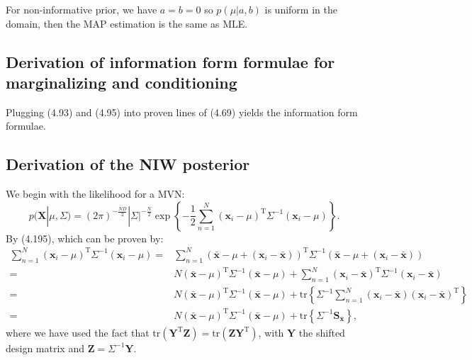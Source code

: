 \documentclass[UTF8]{ctexart}
\begin{document}
For non-informative prior, we have $a=b=0$ so $p(\mu|a,b)$ is uniform in the domain, then the MAP estimation is the same as MLE.

\subsection{Derivation of information form formulae for marginalizing and conditioning}
Plugging (4.93) and (4.95) into proven lines of (4.69) yields the information form formulae.

\subsection{Derivation of the NIW posterior}
We begin with the likelihood for a MVN:
$$p(\textbf{X}|\mu,\Sigma) = (2\pi)^{-\frac{ND}{2}}|\Sigma|^{-\frac{N}{2}}\exp\left\{ -\frac{1}{2}\sum_{n=1}^{N}(\textbf{x}_{i}-\mu)^{\text{T}}\Sigma^{-1}(\textbf{x}_{i}-\mu) \right\}.$$
By (4.195), which can be proven by:
\begin{align}
\sum_{n=1}^{N}(\textbf{x}_{i}-\mu)^{\text{T}}\Sigma^{-1}(\textbf{x}_{i}-\mu) =&\sum_{n=1}^{N}(\bar{\textbf{x}} - \mu + (\textbf{x}_{i} - \bar{\textbf{x}}))^{\text{T}}\Sigma^{-1}(\bar{\textbf{x}} - \mu + (\textbf{x}_{i} - \bar{\textbf{x}})) \nonumber \\
=&N(\bar{\textbf{x}}-\mu)^{\text{T}}\Sigma^{-1}(\bar{\textbf{x}}-\mu) + \sum_{n=1}^{N}(\textbf{x}_{i} - \bar{\textbf{x}})^{\text{T}}\Sigma^{-1}(\textbf{x}_{i}-\bar{\textbf{x}}) \nonumber \\
=&N(\bar{\textbf{x}}-\mu)^{\text{T}}\Sigma^{-1}(\bar{\textbf{x}}-\mu) + \text{tr}\left\{\Sigma^{-1}\sum_{n=1}^{N}(\textbf{x}_{i}-\bar{\textbf{x}})(\textbf{x}_{i} - \bar{\textbf{x}})^{\text{T}}\right\}\nonumber \\
=&N(\bar{\textbf{x}}-\mu)^{\text{T}}\Sigma^{-1}(\bar{\textbf{x}}-\mu) + \text{tr}\left\{ \Sigma^{-1} \textbf{S}_{\bar{\textbf{x}}}\right\},\nonumber
\end{align}
where we have used the fact that $\text{tr}(\textbf{Y}^{\text{T}}\textbf{Z})=\text{tr}(\textbf{Z}\textbf{Y}^{\text{T}})$, with $\textbf{Y}$ the shifted design matrix and $\textbf{Z}=\Sigma^{-1}\textbf{Y}$.
\end{document}
